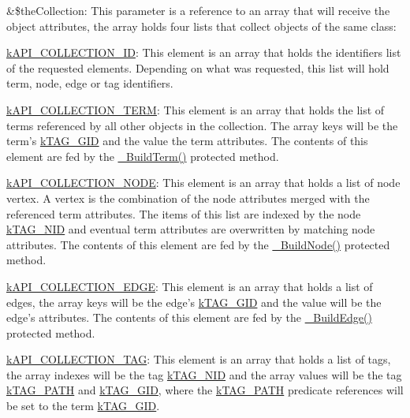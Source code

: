 \begin{DoxyItemize}
\item {\ttfamily \&\$the\-Collection}\-: This parameter is a reference to an array that will receive the object attributes, the array holds four lists that collect objects of the same class\-: 
\begin{DoxyItemize}
\item {\ttfamily \hyperlink{}{k\-A\-P\-I\-\_\-\-C\-O\-L\-L\-E\-C\-T\-I\-O\-N\-\_\-\-I\-D}}\-: This element is an array that holds the identifiers list of the requested elements. Depending on what was requested, this list will hold term, node, edge or tag identifiers. 
\item {\ttfamily \hyperlink{}{k\-A\-P\-I\-\_\-\-C\-O\-L\-L\-E\-C\-T\-I\-O\-N\-\_\-\-T\-E\-R\-M}}\-: This element is an array that holds the list of terms referenced by all other objects in the collection. The array keys will be the term's \hyperlink{}{k\-T\-A\-G\-\_\-\-G\-I\-D} and the value the term attributes. The contents of this element are fed by the \hyperlink{class_c_ontology_wrapper_a7d37edd771ffa60b36ead632c2e46534}{\-\_\-\-Build\-Term()} protected method. 
\item {\ttfamily \hyperlink{}{k\-A\-P\-I\-\_\-\-C\-O\-L\-L\-E\-C\-T\-I\-O\-N\-\_\-\-N\-O\-D\-E}}\-: This element is an array that holds a list of node vertex. A vertex is the combination of the node attributes merged with the referenced term attributes. The items of this list are indexed by the node \hyperlink{}{k\-T\-A\-G\-\_\-\-N\-I\-D} and eventual term attributes are overwritten by matching node attributes. The contents of this element are fed by the \hyperlink{class_c_ontology_wrapper_a3149d34bb488513db2d572f3002bebce}{\-\_\-\-Build\-Node()} protected method. 
\item {\ttfamily \hyperlink{}{k\-A\-P\-I\-\_\-\-C\-O\-L\-L\-E\-C\-T\-I\-O\-N\-\_\-\-E\-D\-G\-E}}\-: This element is an array that holds a list of edges, the array keys will be the edge's \hyperlink{}{k\-T\-A\-G\-\_\-\-G\-I\-D} and the value will be the edge's attributes. The contents of this element are fed by the \hyperlink{}{\-\_\-\-Build\-Edge()} protected method. 
\item {\ttfamily \hyperlink{}{k\-A\-P\-I\-\_\-\-C\-O\-L\-L\-E\-C\-T\-I\-O\-N\-\_\-\-T\-A\-G}}\-: This element is an array that holds a list of tags, the array indexes will be the tag \hyperlink{}{k\-T\-A\-G\-\_\-\-N\-I\-D} and the array values will be the tag \hyperlink{}{k\-T\-A\-G\-\_\-\-P\-A\-T\-H} and \hyperlink{}{k\-T\-A\-G\-\_\-\-G\-I\-D}, where the \hyperlink{}{k\-T\-A\-G\-\_\-\-P\-A\-T\-H} predicate references will be set to the term \hyperlink{}{k\-T\-A\-G\-\_\-\-G\-I\-D}. 

\end{DoxyItemize}
\end{DoxyItemize}
